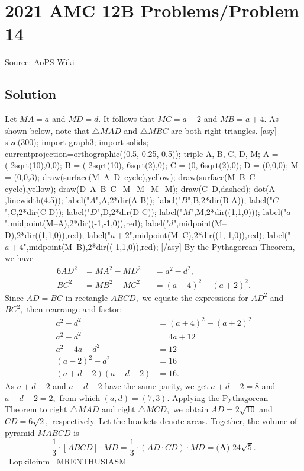 \documentclass[12pt]{article}
\begin{document}
\section*{{2021 AMC 12B Problems/Problem 14}}
Source: AoPS Wiki

\subsection*{Solution}
Let $MA=a$ and $MD=d.$ It follows that $MC=a+2$ and $MB=a+4.$ As shown below, note that $\triangle MAD$ and $\triangle MBC$ are both right triangles. [asy] size(300); import graph3; import solids; currentprojection=orthographic((0.5,-0.25,-0.5)); triple A, B, C, D, M; A = (-2sqrt(10),0,0); B = (-2sqrt(10),-6sqrt(2),0); C = (0,-6sqrt(2),0); D = (0,0,0); M = (0,0,3); draw(surface(M--A--D--cycle),yellow); draw(surface(M--B--C--cycle),yellow); draw(D--A--B--C^^A--M^^B--M^^C--M^^D--M); draw(C--D,dashed); dot(A^^B^^C^^D^^M,linewidth(4.5)); label("$A$",A,2*dir(A-B)); label("$B$",B,2*dir(B-A)); label("$C$",C,2*dir(C-D)); label("$D$",D,2*dir(D-C)); label("$M$",M,2*dir((1,1,0))); label("$a$",midpoint(M--A),2*dir((-1,-1,0)),red); label("$d$",midpoint(M--D),2*dir((1,1,0)),red); label("$a+2$",midpoint(M--C),2*dir((1,-1,0)),red); label("$a+4$",midpoint(M--B),2*dir((-1,1,0)),red); [/asy] By the Pythagorean Theorem, we have \begin{alignat*}{6} AD^2 &= MA^2 - MD^2 &&= a^2 - d^2, \\ BC^2 &= MB^2 - MC^2 &&= (a+4)^2 - (a+2)^2. \end{alignat*} Since $AD=BC$ in rectangle $ABCD,$ we equate the expressions for $AD^2$ and $BC^2,$ then rearrange and factor: \begin{align*} a^2 - d^2 &= (a+4)^2 - (a+2)^2 \\ a^2 - d^2 &= 4a + 12 \\ a^2 - 4a - d^2 &= 12 \\ (a-2)^2 - d^2 &= 16 \\ (a+d-2)(a-d-2) &= 16. \end{align*} As $a+d-2$ and $a-d-2$ have the same parity, we get $a+d-2=8$ and $a-d-2=2,$ from which $(a,d)=(7,3).$ Applying the Pythagorean Theorem to right $\triangle MAD$ and right $\triangle MCD,$ we obtain $AD=2\sqrt{10}$ and $CD=6\sqrt2,$ respectively. Let the brackets denote areas. Together, the volume of pyramid $MABCD$ is \[\frac13\cdot [ABCD]\cdot MD = \frac13\cdot (AD\cdot CD)\cdot MD = \boxed{\textbf{(A) }24\sqrt5}.\] ~Lopkiloinm ~MRENTHUSIASM
\end{document}

